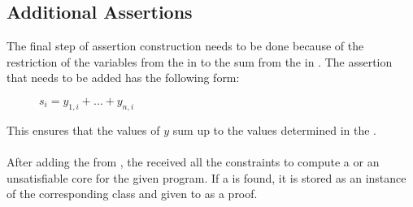 \subsection{Additional Assertions}
\label{sec:additional-assertion}
The final step of assertion construction needs to be done because of the restriction of the variables from the \rayc in  to the sum from the \pointc in .\newline
The assertion that needs to be added has the following form:
\begin{figure}[H]
	\centering
	$s_i = y_{1,i}+ \dots + y_{n,i}$
\end{figure}
This ensures that the values of $y$ sum up to the values determined in the \pointc.
\\
\\
After adding the \addasss from , the \solver received all the constraints to compute a \gna or an unsatisfiable core for the given program.\newline
If a \gna is found, it is stored as an instance of the corresponding class and given to \aprove as a proof.

